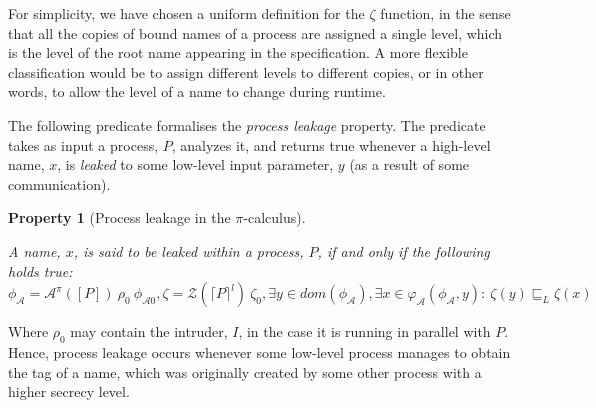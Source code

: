 \documentclass[10pt,a4paper,final,oneside,fleqn]{book}
\begin{document}
For simplicity, we have chosen a uniform definition for the $\zeta$ function, in the sense that all the copies of bound names of a process are assigned a single level, which is the level of the root name appearing in the specification.  A more flexible classification would be to assign different levels to different copies, or in other words, to allow the level of a name to change during runtime.

The following predicate formalises the {\itshape process leakage\/} property.  The predicate takes as input a process, $P$, analyzes it, and returns true whenever a high-level name, $x$, is {\itshape leaked\/} to some low-level input parameter, $y$ (as a result of some communication).
\newtheorem{prop}{Property}
\begin{prop}[Process leakage in the $\pi$-calculus\label{prop1}]
$ $

\noindent
A name, $x$, is said to be leaked within a process, $P$, if and only if the following holds true:\\ $\phi_\mathcal{A}=\mathcal{A}^\pi(\![P]\!)~\rho_0~\phi_{\mathcal{A}0},\zeta=\mathcal{Z}(\lceil P\rceil^l)~\zeta_0,\exists y\in dom(\phi_\mathcal{A}),\exists x\in\varphi_\mathcal{A}(\phi_\mathcal{A},y):~\zeta(y)\sqsubseteq_L\zeta(x)$
\end{prop}
Where $\rho_0$ may contain the intruder, $I$, in the case it is running in parallel with $P$. Hence, process leakage occurs whenever some low-level process manages to obtain the tag of a name, which was originally created by some other process with a higher secrecy level.
\end{document}
